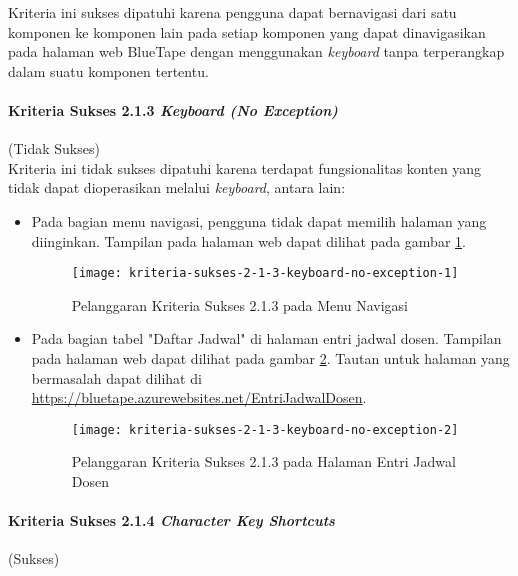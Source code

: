 Kriteria ini sukses dipatuhi karena pengguna dapat bernavigasi dari satu komponen ke komponen lain pada setiap komponen yang dapat dinavigasikan pada halaman web BlueTape dengan menggunakan \textit{keyboard} tanpa terperangkap dalam suatu komponen tertentu.

\paragraph{Kriteria Sukses 2.1.3 \textit{Keyboard (No Exception)}}
\label{par:kepatuhan_bluetape_kriteria_sukses_2.1.3}
(Tidak Sukses)\\

Kriteria ini tidak sukses dipatuhi karena terdapat fungsionalitas konten yang tidak dapat dioperasikan melalui \textit{keyboard}, antara lain:

\begin{itemize}
    \item Pada bagian menu navigasi, pengguna tidak dapat memilih halaman yang diinginkan. Tampilan pada halaman web dapat dilihat pada gambar \ref{fig:2.1.3_keyboard_no_exception_1}.
    \begin{figure}[H]
        \centering  
        \texttt{[image: kriteria-sukses-2-1-3-keyboard-no-exception-1]}  
        \caption[Pelanggaran Kriteria Sukses 2.1.3 pada Menu Navigasi]{Pelanggaran Kriteria Sukses 2.1.3 pada Menu Navigasi}
        \label{fig:2.1.3_keyboard_no_exception_1}  
    \end{figure} 

    \item Pada bagian tabel "Daftar Jadwal" di halaman entri jadwal dosen. Tampilan pada halaman web dapat dilihat pada gambar \ref{fig:2.1.3_keyboard_no_exception_2}. Tautan untuk halaman yang bermasalah dapat dilihat di \url{https://bluetape.azurewebsites.net/EntriJadwalDosen}.
    \begin{figure}[H]
        \centering  
        \texttt{[image: kriteria-sukses-2-1-3-keyboard-no-exception-2]}  
        \caption[Pelanggaran Kriteria Sukses 2.1.3 pada Halaman Entri Jadwal Dosen]{Pelanggaran Kriteria Sukses 2.1.3 pada Halaman Entri Jadwal Dosen}
        \label{fig:2.1.3_keyboard_no_exception_2}  
    \end{figure} 
\end{itemize}

\paragraph{Kriteria Sukses 2.1.4 \textit{Character Key Shortcuts}}
\label{par:kepatuhan_bluetape_kriteria_sukses_2.1.4}
(Sukses)\\

